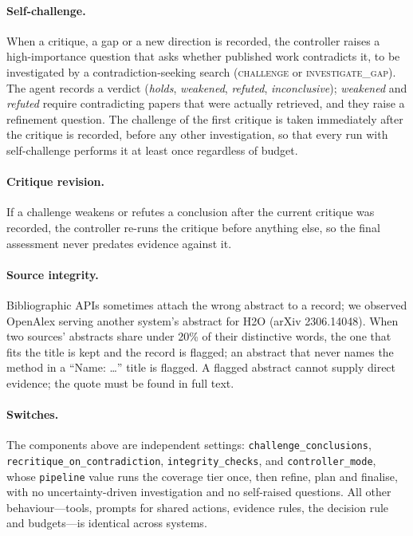 \paragraph{Self-challenge.} When a critique, a gap or a new direction is recorded, the controller raises a high-importance question that asks whether published work contradicts it, to be investigated by a contradiction-seeking search (\textsc{challenge} or \textsc{investigate\_gap}). The agent records a verdict (\emph{holds}, \emph{weakened}, \emph{refuted}, \emph{inconclusive}); \emph{weakened} and \emph{refuted} require contradicting papers that were actually retrieved, and they raise a refinement question. The challenge of the first critique is taken immediately after the critique is recorded, before any other investigation, so that every run with self-challenge performs it at least once regardless of budget.

\paragraph{Critique revision.} If a challenge weakens or refutes a conclusion after the current critique was recorded, the controller re-runs the critique before anything else, so the final assessment never predates evidence against it.

\paragraph{Source integrity.} Bibliographic APIs sometimes attach the wrong abstract to a record; we observed OpenAlex serving another system's abstract for H2O (arXiv 2306.14048). When two sources' abstracts share under 20\% of their distinctive words, the one that fits the title is kept and the record is flagged; an abstract that never names the method in a ``Name: \ldots'' title is flagged. A flagged abstract cannot supply direct evidence; the quote must be found in full text.

\paragraph{Switches.} The components above are independent settings: \texttt{challenge\_conclusions}, \texttt{recritique\_on\_contradiction}, \texttt{integrity\_checks}, and \texttt{controller\_mode}, whose \texttt{pipeline} value runs the coverage tier once, then refine, plan and finalise, with no uncertainty-driven investigation and no self-raised questions. All other behaviour---tools, prompts for shared actions, evidence rules, the decision rule and budgets---is identical across systems.
